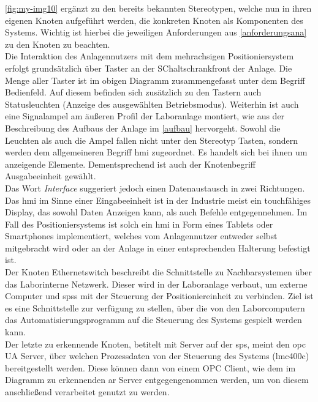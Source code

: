 \documentclass[../../../Bachelorarbeit.tex]{subfiles}
\begin{document}
\autoref{fig:my-img10} ergänzt zu den bereits bekannten Stereotypen, welche nun in ihren eigenen Knoten aufgeführt werden, die konkreten Knoten als Komponenten des Systems. Wichtig ist hierbei die jeweiligen Anforderungen aus \autoref{anforderungsana} zu den Knoten zu beachten.\\
Die Interaktion des Anlagennutzers mit dem mehrachsigen Positioniersystem erfolgt grundsätzlich über Taster an der SChaltschrankfront der Anlage. Die Menge aller Taster ist im obigen Diagramm zusammengefasst unter dem Begriff Bedienfeld. Auf diesem befinden sich zusätzlich zu den Tastern auch Statusleuchten (Anzeige des ausgewählten Betriebsmodus). Weiterhin ist auch eine Signalampel am äußeren Profil der Laboranlage montiert, wie aus der Beschreibung des Aufbaus der Anlage im \autoref{aufbau} hervorgeht. Sowohl die Leuchten als auch die Ampel fallen nicht unter den Stereotyp Tasten, sondern werden dem allgemeineren Begriff \acf{hmi} zugeordnet. Es handelt sich bei ihnen um anzeigende Elemente. Dementsprechend ist auch der Knotenbegriff Ausgabeeinheit gewählt. \\
Das Wort \textit{Interface} suggeriert jedoch einen Datenaustausch in zwei Richtungen. Das \ac{hmi} im Sinne einer Eingabeeinheit ist in der Industrie meist ein touchfähiges Display, das sowohl Daten Anzeigen kann, als auch Befehle entgegennehmen. Im Fall des Positioniersystems ist solch ein \ac{hmi} in Form eines Tablets oder Smartphones implementiert, welches vom Anlagennutzer entweder selbst mitgebracht wird oder an der Anlage in einer entsprechenden Halterung befestigt ist.\\
Der Knoten Ethernetswitch beschreibt die Schnittstelle zu Nachbarsystemen über das Laborinterne Netzwerk. Dieser wird in der Laboranlage verbaut, um externe Computer und \acsp{sps} mit der Steuerung der Positioniereinheit zu verbinden. Ziel ist es eine Schnittstelle zur verfügung zu stellen, über die von den Laborcomputern das Automatisierungsprogramm auf die Steuerung des Systems gespielt werden kann. \\
Der letzte zu erkennende Knoten, betitelt mit Server auf der \ac{sps}, meint den \ac{opc} UA Server, über welchen Prozessdaten von der Steuerung des Systems (\acs{lmc}400c) bereitgestellt werden. Diese können dann von einem OPC Client, wie \zB dem im Diagramm zu erkennenden \ac{ar} Server entgegengenommen werden, um von diesem anschließend verarbeitet \bzw genutzt zu werden.
\end{document}
